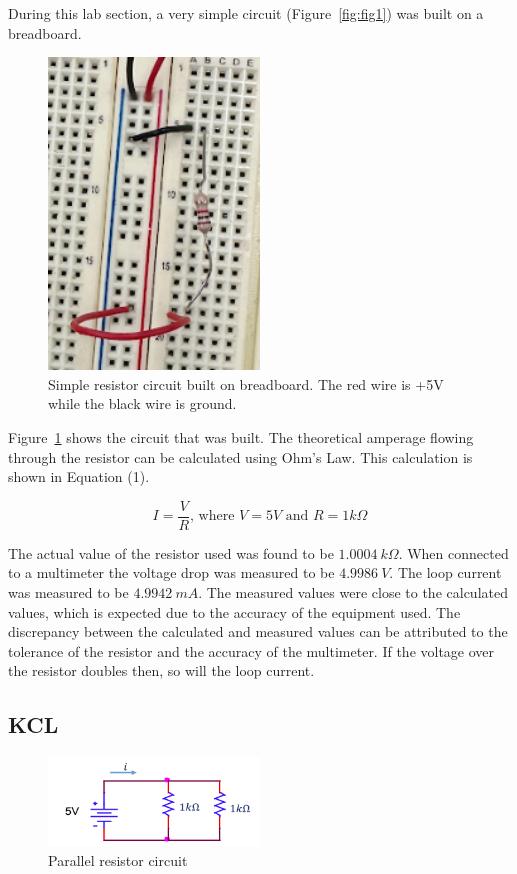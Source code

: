 \documentclass{article}
\begin{document}
During this lab section, a very simple circuit (Figure~\ref{fig:fig1}) was built on a
breadboard.

\begin{figure}[H]
	\centering
	\includegraphics[angle=90,origin=c,width=0.5\textwidth]{built_figure1.png}
	\caption{Simple resistor circuit built on breadboard. The red wire is +5V while the black wire is ground.}
	\label{fig:fig2}
\end{figure}

Figure~\ref{fig:fig2} shows the circuit that was built.
The theoretical amperage flowing through the resistor can be calculated
using Ohm's Law. This calculation is shown in Equation (1).

\begin{equation}
	I = \frac{V}{R}
	\text{, where } V = 5V \text{ and } R = 1k\Omega
\end{equation}

The actual value of the resistor used was found to be $1.0004 \: k\Omega$. When
connected to a multimeter the voltage drop was measured to be $4.9986 \: V$.
The loop current was measured to be $4.9942 \: mA$. The measured values were close to the
calculated values, which is expected due to the accuracy of the equipment used.
The discrepancy between the calculated and measured values can be attributed to the
tolerance of the resistor and the accuracy of the multimeter. If the voltage over the
resistor doubles then, so will the loop current.

\subsection{KCL}
\begin{figure}[H]
	\centering
	\includegraphics[width=0.5\textwidth]{parallel_resistor_for_part2.png}
	\caption{Parallel resistor circuit}
	\label{fig:fig3}
\end{figure}
\end{document}
